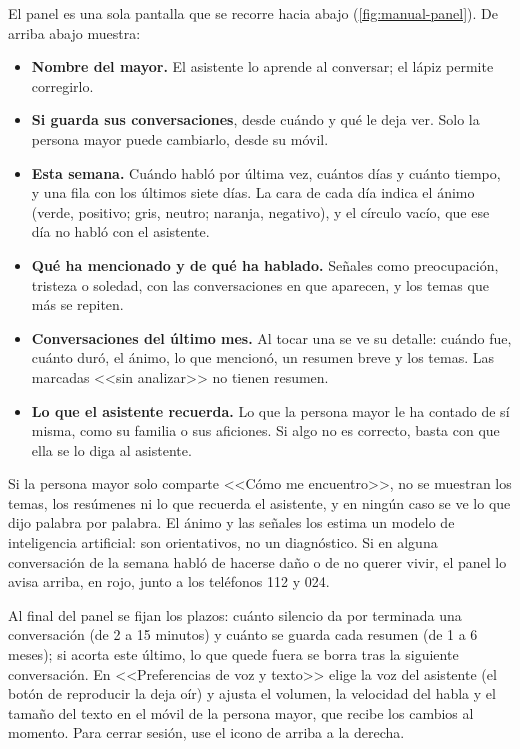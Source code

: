El panel es una sola pantalla que se recorre hacia abajo (\autoref{fig:manual-panel}). De arriba abajo muestra:

\begin{itemize}
  \item \textbf{Nombre del mayor.} El asistente lo aprende al conversar; el lápiz permite corregirlo.
  \item \textbf{Si guarda sus conversaciones}, desde cuándo y qué le deja ver. Solo la persona mayor puede cambiarlo, desde su móvil.
  \item \textbf{Esta semana.} Cuándo habló por última vez, cuántos días y cuánto tiempo, y una fila con los últimos siete días. La cara de cada día indica el ánimo (verde, positivo; gris, neutro; naranja, negativo), y el círculo vacío, que ese día no habló con el asistente.
  \item \textbf{Qué ha mencionado y de qué ha hablado.} Señales como preocupación, tristeza o soledad, con las conversaciones en que aparecen, y los temas que más se repiten.
  \item \textbf{Conversaciones del último mes.} Al tocar una se ve su detalle: cuándo fue, cuánto duró, el ánimo, lo que mencionó, un resumen breve y los temas. Las marcadas <<sin analizar>> no tienen resumen.
  \item \textbf{Lo que el asistente recuerda.} Lo que la persona mayor le ha contado de sí misma, como su familia o sus aficiones. Si algo no es correcto, basta con que ella se lo diga al asistente.
\end{itemize}

Si la persona mayor solo comparte <<Cómo me encuentro>>, no se muestran los temas, los resúmenes ni lo que recuerda el asistente, y en ningún caso se ve lo que dijo palabra por palabra. El ánimo y las señales los estima un modelo de inteligencia artificial: son orientativos, no un diagnóstico. Si en alguna conversación de la semana habló de hacerse daño o de no querer vivir, el panel lo avisa arriba, en rojo, junto a los teléfonos 112 y 024.

Al final del panel se fijan los plazos: cuánto silencio da por terminada una conversación (de 2 a 15 minutos) y cuánto se guarda cada resumen (de 1 a 6 meses); si acorta este último, lo que quede fuera se borra tras la siguiente conversación. En <<Preferencias de voz y texto>> elige la voz del asistente (el botón de reproducir la deja oír) y ajusta el volumen, la velocidad del habla y el tamaño del texto en el móvil de la persona mayor, que recibe los cambios al momento. Para cerrar sesión, use el icono de arriba a la derecha.
